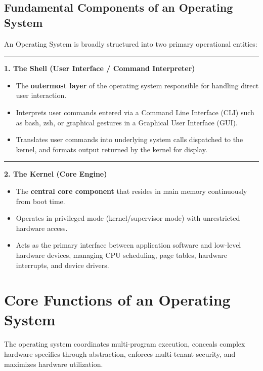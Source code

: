 \documentclass[11pt,a4paper]{article}
\newcommand{\ic}[1]{\mbox{\colorbox{AnthCodeBG}{\footnotesize\ttfamily\textcolor{AnthBlue}{#1}}}}
\newcommand{\concept}[1]{%
  \noindent\textcolor{AnthGreen}{\rule{3pt}{10pt}}\enspace
  \textbf{\color{AnthDark}#1}\par\vspace{2pt}%
}
\begin{document}
\subsection{Fundamental Components of an Operating System}

An Operating System is broadly structured into two primary operational entities:

\concept{1. The Shell (User Interface / Command Interpreter)}
\begin{itemize}
    \item The \textbf{outermost layer} of the operating system responsible for handling direct user interaction.
    \item Interprets user commands entered via a Command Line Interface (CLI) such as \ic{bash}, \ic{zsh}, or graphical gestures in a Graphical User Interface (GUI).
    \item Translates user commands into underlying system calls dispatched to the kernel, and formats output returned by the kernel for display.
\end{itemize}

\concept{2. The Kernel (Core Engine)}
\begin{itemize}
    \item The \textbf{central core component} that resides in main memory continuously from boot time.
    \item Operates in privileged mode (kernel/supervisor mode) with unrestricted hardware access.
    \item Acts as the primary interface between application software and low-level hardware devices, managing CPU scheduling, page tables, hardware interrupts, and device drivers.
\end{itemize}

\section{Core Functions of an Operating System}

The operating system coordinates multi-program execution, conceals complex hardware specifics through abstraction, enforces multi-tenant security, and maximizes hardware utilization.
\end{document}
